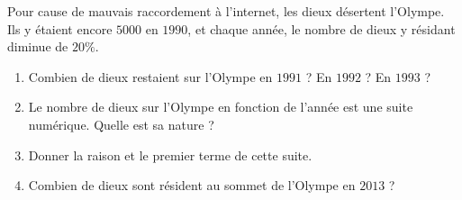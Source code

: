 
\begin{exercice}\label{exosmath-0263}

    Pour cause de mauvais raccordement à l'internet, les dieux désertent l'Olympe. Ils y étaient encore \( 5000\) en \( 1990\), et chaque année, le nombre de dieux y résidant diminue de \( 20\%\).
    \begin{enumerate}
        \item
            Combien de dieux restaient sur l'Olympe en \( 1991\) ? En \( 1992\) ? En \( 1993\) ?
        \item
            Le nombre de dieux sur l'Olympe en fonction de l'année est une suite numérique. Quelle est sa nature ?
        \item
            Donner la raison et le premier terme de cette suite.
        \item
            Combien de dieux sont résident au sommet de l'Olympe en \( 2013\) ?
    \end{enumerate}

\end{exercice}
